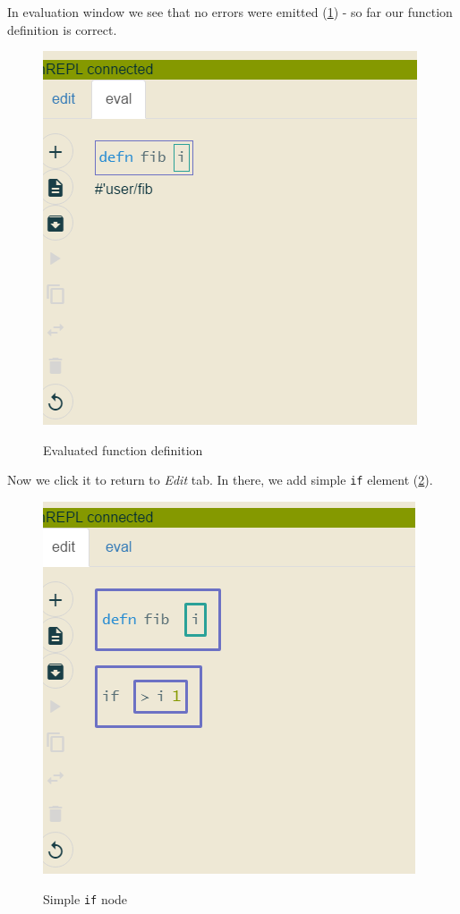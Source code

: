 \documentclass[11pt]{scrartcl}
\begin{document}
In evaluation window we see that no errors were emitted (\ref{j-defn-eval-result}) - so far our function
definition is correct.

\begin{figure}[hbt]
  \includegraphics[scale=0.3]{img/j-defn-eval-result}
  \label{j-defn-eval-result}
  \caption{Evaluated function definition}
\end{figure}

Now we click it to return to \textit{Edit} tab. In there, we add simple
\lstinline{if} element (\ref{j-if}).

\begin{figure}[hbt]
  \includegraphics[scale=0.3]{img/j-if}
  \label{j-if}
  \caption{Simple \lstinline{if} node}
\end{figure}
\end{document}
